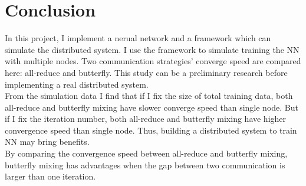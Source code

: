 \documentclass{article}
\begin{document}
\section{Conclusion}

In this project, I implement a nerual network and a framework which can simulate the distributed system. I use the framework to simulate training the NN with multiple nodes. Two communication strategies' converge speed are compared here: all-reduce and butterfly. This study can be a preliminary research before implementing a real distributed system.\\

From the simulation data I find that if I fix the size of total training data, both all-reduce and butterfly mixing have slower converge speed than single node. But if I fix the iteration number, both all-reduce and butterfly mixing have higher convergence speed than single node. Thus, building a distributed system to train NN may bring benefits. \\

By comparing the convergence speed between all-reduce and butterfly mixing, butterfly mixing has advantages when the gap between two communication is larger than one iteration.  




\end{document}
